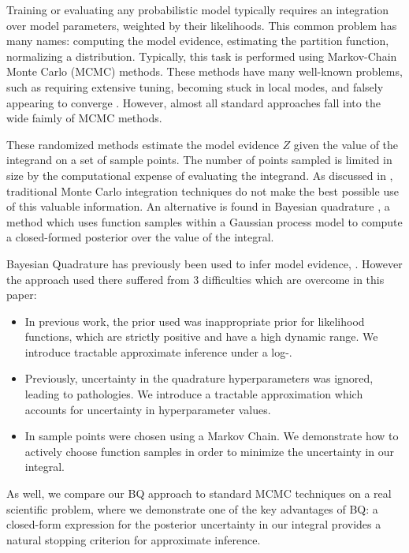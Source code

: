 \documentclass{article}
\begin{document}
Training or evaluating any probabilistic model typically requires an integration over model parameters, weighted by their likelihoods.  This common problem has many names:  computing the model evidence, estimating the partition function, normalizing a distribution.  Typically, this task is performed using Markov-Chain Monte Carlo (MCMC) methods.  These methods have many well-known problems, such as requiring extensive tuning, becoming stuck in local modes, and falsely appearing to converge \citep{NealMC}.  However, almost all standard approaches fall into the wide faimly of MCMC methods.

These randomized methods estimate the model evidence $Z$ given the value of the integrand on a set of sample points.  The number of points sampled is limited in size by the computational expense of evaluating the integrand. As discussed in \citep{MCUnsound}, traditional Monte Carlo integration techniques do not make the best possible use of this valuable information. An alternative is found in Bayesian quadrature \citep{BZHermiteQuadrature}, a method which uses function samples within a Gaussian process model to compute a closed-formed posterior over the value of the integral.

Bayesian Quadrature has previously been used to infer model evidence, \citep{BZMonteCarlo}.  However the approach used there suffered from 3 difficulties which are overcome in this paper: 
\begin{itemize}
\item In previous work, the \gpb prior used was inappropriate prior for likelihood functions, which are strictly positive and have a high dynamic range.  We introduce tractable approximate inference under a log-\gp.

\item Previously, uncertainty in the quadrature hyperparameters was ignored, leading to pathologies.  We introduce a tractable approximation which accounts for uncertainty in hyperparameter values.  

\item In \citep{BZMonteCarlo} sample points were chosen using a Markov Chain.  We demonstrate how to actively choose function samples in order to minimize the uncertainty in our integral.
\end{itemize}
As well, we compare our BQ approach to standard MCMC techniques on a real scientific problem, where we demonstrate one of the key advantages of BQ: a closed-form expression for the posterior uncertainty in our integral provides a natural stopping criterion for approximate inference.
\end{document}
